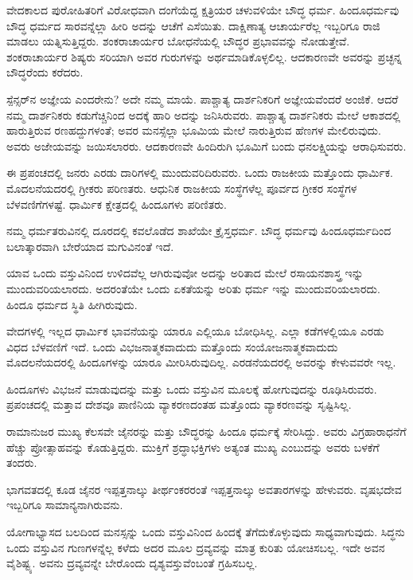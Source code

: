 ವೇದಕಾಲದ ಪುರೋಹಿತರಿಗೆ ವಿರೋಧವಾಗಿ ದಂಗೆಯೆದ್ದ ಕ್ಷತ್ರಿಯರ ಚಳುವಳಿಯೇ ಬೌದ್ಧ ಧರ್ಮ. ಹಿಂದೂಧರ್ಮವು ಬೌದ್ಧ ಧರ್ಮದ ಸಾರವನ್ನೆಲ್ಲಾ ಹೀರಿ ಅದನ್ನು ಆಚೆಗೆ ಎಸೆಯಿತು. ದಾಕ್ಷಿಣಾತ್ಯ ಆಚಾರ್ಯರೆಲ್ಲ ಇಬ್ಬರಿಗೂ ರಾಜಿ ಮಾಡಲು ಯತ್ನಿಸುತ್ತಿದ್ದರು. ಶಂಕರಾಚಾರ್ಯರ ಬೋಧನೆಯಲ್ಲಿ ಬೌದ್ಧರ ಪ್ರಭಾವವನ್ನು ನೋಡುತ್ತೇವೆ. ಶಂಕರಾಚಾರ್ಯರ ಶಿಷ್ಯರು ಸರಿಯಾಗಿ ಅವರ ಗುರುಗಳನ್ನು ಅರ್ಥಮಾಡಿಕೊಳ್ಳಲಿಲ್ಲ. ಆದಕಾರಣವೇ ಅವರನ್ನು ಪ್ರಚ್ಛನ್ನ ಬೌದ್ಧರೆಂದು ಕರೆದರು.

ಸ್ಪೆನ್ಸರ್‌ನ ಅಜ್ಞೇಯ ಎಂದರೇನು? ಅದೇ ನಮ್ಮ ಮಾಯೆ. ಪಾಶ್ಚಾತ್ಯ ದಾರ್ಶನಿಕರಿಗೆ ಅಜ್ಞೇಯವೆಂದರೆ ಅಂಜಿಕೆ. ಆದರೆ ನಮ್ಮ ದಾರ್ಶನಿಕರು ಕಡುಗೆಚ್ಚಿನಿಂದ ಅದಕ್ಕೆ ಹಾರಿ ಅದನ್ನು ಜನಿಸಿರುವರು. ಪಾಶ್ಚಾತ್ಯ ದಾರ್ಶನಿಕರು ಮೇಲೆ ಆಕಾಶದಲ್ಲಿ ಹಾರುತ್ತಿರುವ ರಣಹದ್ದುಗಳಂತೆ; ಅವರ ಮನಸ್ಸೆಲ್ಲಾ ಭೂಮಿಯ ಮೇಲೆ ನಾರುತ್ತಿರುವ ಹೆಣಗಳ ಮೇಲಿರುವುದು. ಅವರು ಅಜೇಯವನ್ನು ಜಯಿಸಲಾರರು. ಆದಕಾರಣವೇ ಹಿಂದಿರುಗಿ ಭೂಮಿಗೆ ಬಂದು ಧನಲಕ್ಷ್ಮಿಯನ್ನು ಆರಾಧಿಸುವರು.

ಈ ಪ್ರಪಂಚದಲ್ಲಿ ಜನರು ಎರಡು ದಾರಿಗಳಲ್ಲಿ ಮುಂದುವರಿದಿರುವರು. ಒಂದು ರಾಜಕೀಯ ಮತ್ತೊಂದು ಧಾರ್ಮಿಕ. ಮೊದಲನೆಯದರಲ್ಲಿ ಗ್ರೀಕರು ಪರಿಣತರು. ಆಧುನಿಕ ರಾಜಕೀಯ ಸಂಸ್ಥೆಗಳೆಲ್ಲ ಪೂರ್ವದ ಗ್ರೀಕರ ಸಂಸ್ಥೆಗಳ ಬೆಳವಣಿಗೆಗಳಷ್ಟೆ. ಧಾರ್ಮಿಕ ಕ್ಷೇತ್ರದಲ್ಲಿ ಹಿಂದೂಗಳು ಪರಿಣಿತರು.

ನಮ್ಮ ಧರ್ಮತರುವಿನಲ್ಲಿ ದೂರದಲ್ಲಿ ಕವಲೊಡೆದ ಶಾಖೆಯೇ ಕ್ರೈಸ್ತಧರ್ಮ. ಬೌದ್ಧ ಧರ್ಮವು ಹಿಂದೂಧರ್ಮದಿಂದ ಬಲಾತ್ಕಾರವಾಗಿ ಬೇರೆಯಾದ ಮಗುವಿನಂತೆ ಇದೆ.

ಯಾವ ಒಂದು ವಸ್ತುವಿನಿಂದ ಉಳಿದವೆಲ್ಲ ಆಗಿರುವುವೋ ಅದನ್ನು ಅರಿತಾದ ಮೇಲೆ ರಸಾಯನಶಾಸ್ತ್ರ ಇನ್ನು ಮುಂದುವರಿಯಲಾರದು. ಅದರಂತೆಯೇ ಒಂದು ಏಕತೆಯನ್ನು ಅರಿತು ಧರ್ಮ ಇನ್ನು ಮುಂದುವರಿಯಲಾರದು. ಹಿಂದೂ ಧರ್ಮದ ಸ್ಥಿತಿ ಹೀಗಿರುವುದು.

ವೇದಗಳಲ್ಲಿ ಇಲ್ಲದ ಧಾರ್ಮಿಕ ಭಾವನೆಯನ್ನು ಯಾರೂ ಎಲ್ಲಿಯೂ ಬೋಧಿಸಿಲ್ಲ. ಎಲ್ಲಾ ಕಡೆಗಳಲ್ಲಿಯೂ ಎರಡು ವಿಧದ ಬೆಳವಣಿಗೆ ಇದೆ. ಒಂದು ವಿಭಜನಾತ್ಮಕವಾದುದು  ಮತ್ತೊಂದು ಸಂಯೋಜನಾತ್ಮಕವಾದುದು  ಮೊದಲನೆಯದರಲ್ಲಿ ಹಿಂದೂಗಳನ್ನು ಯಾರೂ ಮೀರಿಸಿರುವುದಿಲ್ಲ. ಎರಡನೆಯದರಲ್ಲಿ ಅವರನ್ನು ಕೇಳುವವರೇ ಇಲ್ಲ.

ಹಿಂದೂಗಳು ವಿಭಜನೆ ಮಾಡುವುದನ್ನು ಮತ್ತು ಒಂದು ವಸ್ತುವಿನ ಮೂಲಕ್ಕೆ ಹೋಗುವುದನ್ನು ರೂಢಿಸಿರುವರು. ಪ್ರಪಂಚದಲ್ಲಿ ಮತ್ತಾವ ದೇಶವೂ ಪಾಣಿನಿಯ ವ್ಯಾಕರಣದಂತಹ ಮತ್ತೊಂದು ವ್ಯಾಕರಣವನ್ನು ಸೃಷ್ಟಿಸಿಲ್ಲ.

ರಾಮಾನುಜರ ಮುಖ್ಯ ಕೆಲಸವೇ ಜೈನರನ್ನು ಮತ್ತು ಬೌದ್ಧರನ್ನು ಹಿಂದೂ ಧರ್ಮಕ್ಕೆ ಸೇರಿಸಿದ್ದು. ಅವರು ವಿಗ್ರಹಾರಾಧನೆಗೆ ಹೆಚ್ಚು ಪ್ರೋತ್ಸಾಹವನ್ನು ಕೊಡುತ್ತಿದ್ದರು. ಮುಕ್ತಿಗೆ ಶ್ರದ್ಧಾಭಕ್ತಿಗಳು ಅತ್ಯಂತ ಮುಖ್ಯ ಎಂಬುದನ್ನು ಅವರು ಬಳಕೆಗೆ ತಂದರು.

ಭಾಗವತದಲ್ಲಿ ಕೂಡ ಜೈನರ ಇಪ್ಪತ್ತನಾಲ್ಕು ತೀರ್ಥಂಕರರಂತೆ ಇಪ್ಪತ್ತನಾಲ್ಕು ಅವತಾರಗಳನ್ನು ಹೇಳುವರು. ವೃಷಭದೇವ ಇಬ್ಬರಿಗೂ ಸಾಮಾನ್ಯನಾಗಿರುವನು.

ಯೋಗಾಭ್ಯಾಸದ ಬಲದಿಂದ ಮನಸ್ಸನ್ನು ಒಂದು ವಸ್ತುವಿನಿಂದ ಹಿಂದಕ್ಕೆ ತೆಗೆದುಕೊಳ್ಳುವುದು ಸಾಧ್ಯವಾಗುವುದು. ಸಿದ್ಧನು ಒಂದು ವಸ್ತುವಿನ ಗುಣಗಳನ್ನೆಲ್ಲ ಕಳೆದು ಅದರ ಮೂಲ ದ್ರವ್ಯವನ್ನು ಮಾತ್ರ ಕುರಿತು ಯೋಚಿಸಬಲ್ಲ. ಇದೇ ಅವನ ವೈಶಿಷ್ಟ್ಯ. ಅವನು ದ್ರವ್ಯವನ್ನೇ ಬೇರೊಂದು ದೃಶ್ಯವಸ್ತುವೆಂಬಂತೆ ಗ್ರಹಿಸಬಲ್ಲ.


